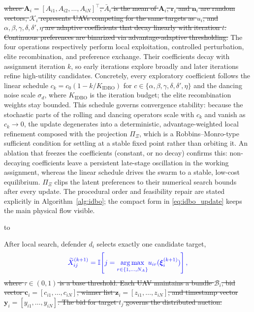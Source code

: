 \documentclass[lettersize,journal]{IEEEtran}
\providecommand{\DIFadd}[1]{{\protect\color{blue}#1}} %
\providecommand{\DIFdel}[1]{{\protect\color{red}\sout{#1}}}                      %
\newcommand{\DIFdelDISPLAY}[1]{%
  \par\addvspace{4pt}%
  \sbox{\DIFDELbox}{$\displaystyle\color{red}\begin{aligned}#1\end{aligned}$}%
  \noindent\hbox to\hsize{\hfil %
    \rlap{\usebox{\DIFDELbox}}%
    \raisebox{\dimexpr(\ht\DIFDELbox-\dp\DIFDELbox)/2\relax}[0pt][0pt]{\textcolor{red}{\rule{\wd\DIFDELbox}{0.6pt}}}%
    \hfil}%
  \par\addvspace{4pt}%
} %
\providecommand{\DIFaddbegin}{} %
\providecommand{\DIFaddend}{} %
\providecommand{\DIFdelbegin}{} %
\providecommand{\DIFdelend}{} %
\newcommand{\DIFscaledelfig}{0.5}
\newlength{\DIFdelgraphicswidth} %
\newlength{\DIFdelgraphicsheight} %
\newcommand{\DIFaddincludegraphics}[2][]{{\color{blue}\fbox{\DIFOincludegraphics[#1]{#2}}}} %
\newcommand{\DIFdelincludegraphics}[2][]{%
\sbox{\DIFdelgraphicsbox}{\DIFOincludegraphics[#1]{#2}}%
\settoboxwidth{\DIFdelgraphicswidth}{\DIFdelgraphicsbox} %
\settoboxtotalheight{\DIFdelgraphicsheight}{\DIFdelgraphicsbox} %
\scalebox{\DIFscaledelfig}{%
\parbox[b]{\DIFdelgraphicswidth}{\usebox{\DIFdelgraphicsbox}\\[-\baselineskip] \rule{\DIFdelgraphicswidth}{0em}}\llap{\resizebox{\DIFdelgraphicswidth}{\DIFdelgraphicsheight}{%
\setlength{\unitlength}{\DIFdelgraphicswidth}%
\begin{picture}(1,1)%
\thicklines\linethickness{2pt} %
{\color[rgb]{1,0,0}\put(0,0){\framebox(1,1){}}}%
{\color[rgb]{1,0,0}\put(0,0){\line( 1,1){1}}}%
{\color[rgb]{1,0,0}\put(0,1){\line(1,-1){1}}}%
\end{picture}%
}\hspace*{3pt}}} %
} %
\DeclareRobustCommand{\DIFaddbegin}{\DIFOaddbegin \let\includegraphics\DIFaddincludegraphics} %
\DeclareRobustCommand{\DIFaddend}{\DIFOaddend \let\includegraphics\DIFOincludegraphics} %
\DeclareRobustCommand{\DIFdelbegin}{\DIFOdelbegin \let\includegraphics\DIFdelincludegraphics} %
\DeclareRobustCommand{\DIFdelend}{\DIFOaddend \let\includegraphics\DIFOincludegraphics} %
\begin{document}
\DIFdelbegin \DIFdel{where $\mathbf{A}_i = [A_{i1}, A_{i2}, \dots, A_{iN}]^\top$, $\bar{A}_i$ is the mean of $\mathbf{A}_i$, $\mathbf{r}_i$ and $\mathbf{n}_i$ are random vectors, $\mathcal{K}_i$ represents UAVs competing for the same targets as $u_i$, and $\alpha, \beta, \gamma, \delta, \delta', \eta$ are adaptive coefficients that decay linearly with iteration $t$.
Continuous preferences are binarized via advantage-adaptive thresholding:
}\DIFdelend \DIFaddbegin \DIFadd{The four operations respectively perform local exploitation, controlled perturbation, elite
recombination, and preference exchange. Their coefficients decay with assignment iteration
$k$, so early iterations explore broadly and later iterations refine high-utility candidates.
Concretely, every exploratory coefficient follows the linear schedule
$c_k=c_0(1-k/K_{\mathrm{IDBO}})$ for $c\in\{\alpha,\beta,\gamma,\delta,\delta',\eta\}$ and the
dancing noise scale $\sigma_d$, where $K_{\mathrm{IDBO}}$ is the iteration budget; the elite
recombination weights stay bounded. This schedule governs convergence stability: because the
stochastic parts of the rolling and dancing operators scale with $c_k$ and vanish as
$c_k\!\to\!0$, the update degenerates into a deterministic, advantage-weighted local
refinement composed with the projection $\Pi_{\Xi}$, which is a Robbins--Monro-type sufficient
condition for settling at a stable fixed point rather than orbiting it. An ablation that
freezes the coefficients (constant, or no decay) confirms this: non-decaying coefficients leave
a persistent late-stage oscillation in the working assignment, whereas the linear schedule
drives the swarm to a stable, low-cost equilibrium.
$\Pi_{\Xi}$ clips the latent preferences to their numerical search bounds after every update.
The procedural order and feasibility repair are stated explicitly in Algorithm~\ref{alg:idbo};
the compact form in }\eqref{eq:idbo_update} \DIFadd{keeps the main physical flow visible.
}\DIFaddend 

\DIFdelbegin \DIFdelDISPLAY{%
X_{ij} = 
\begin{cases}
1, & \text{if } \sigma(x_{ij}) > \tau \cdot \left(1 + \frac{A_{ij}}{\max_k A_{ik}}\right) \\
0, & \text{otherwise}
\end{cases}
}
\DIFdelend \DIFaddbegin \DIFadd{After local search, defender $d_i$ selects exactly one candidate target,
}\begin{equation}
\DIFadd{\label{eq:candidate_assignment}
\widetilde X_{ij}^{(k+1)}=
\mathbb I\!\left[j=\underset{r\in\{1,\ldots,N_A\}}{\arg\max}
u_{ir}(\boldsymbol\xi_i^{(k+1)})\right],
}\end{equation}\DIFaddend 
\DIFdelbegin \DIFdel{where $\tau \in (0,1)$ is a base threshold.
Each UAV maintains a bundle $\mathcal{B}_i$, bid vector $\mathbf{c}_i = [c_{i1}, \dots, c_{iN}]$,
winner list $\mathbf{z}_i = [z_{i1}, \dots, z_{iN}]$, and timestamp vector $\mathbf{y}_i = [y_{i1}, \dots, y_{iN}]$. The bid for target $t_j$ governs the distributed auction:
}%
\end{document}
